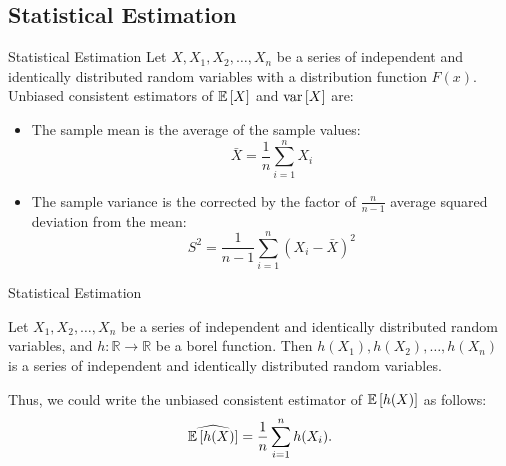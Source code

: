 \subsection{Statistical Estimation}
    \begin{frame}{Statistical Estimation}
        Let $X, X_1, X_2, \dots, X_n$ be a series of independent and identically distributed random variables with a distribution function $F(x)$.
        Unbiased consistent estimators of $\mathbb{E}\left[X\right]$ and $\operatorname*{var} \left[X\right]$ are:
        \begin{itemize}
            \item The sample mean is the average of the sample values:
            \begin{equation}
                \bar{X} = \frac{1}{n} \sum_{i=1}^n X_i
            \end{equation}
            \item The sample variance is the corrected by the factor of $\frac{n}{n-1}$ average squared deviation from the mean:
            \begin{equation}
                S^2 = \frac{1}{n-1} \sum_{i=1}^n (X_i - \bar{X})^2
            \end{equation}
        \end{itemize}
    \end{frame}
    
    \begin{frame}{Statistical Estimation}
        \begin{lemma}
            Let $X_1, X_2, \dots, X_n$ be a series of independent and identically distributed random variables, and $h: \mathbb{R} \to \mathbb{R}$ be a borel function. Then $h(X_1), h(X_2), \dots, h(X_n)$ is a series of independent and identically distributed random variables.
        \end{lemma}
        Thus, we could write the unbiased consistent estimator of $\mathbb{E} \left[h(X)\right]$ as follows:
        \begin{equation}
            \widehat{\mathbb{E} \left[h(X)\right]} = \frac{1}{n} \sum_{i=1}^n h(X_i).
        \end{equation}
    \end{frame}

